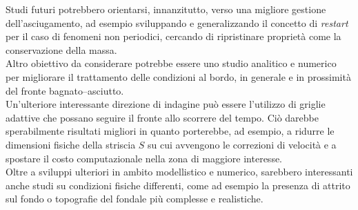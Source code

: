 \documentclass[a4paper,12pt,oneside]{book}
\theoremstyle{definition}
\begin{document}
Studi futuri potrebbero orientarsi, innanzitutto, verso una migliore gestione dell'asciugamento, ad esempio sviluppando e generalizzando il concetto di \emph{restart} per il caso di fenomeni non periodici, cercando di ripristinare propriet\`a come la conservazione della massa.\\
Altro obiettivo da considerare potrebbe essere uno studio analitico e numerico per migliorare il trattamento delle condizioni al bordo, in generale e in prossimit\`a del fronte bagnato--asciutto.\\
Un'ulteriore interessante direzione di indagine pu\`o essere l'utilizzo di griglie adattive che possano seguire il fronte allo scorrere del tempo. Ci\`o darebbe sperabilmente risultati migliori in quanto porterebbe, ad esempio, a ridurre le dimensioni fisiche della striscia $S$ su cui avvengono le correzioni di velocit\`a e a spostare il costo computazionale nella zona di maggiore interesse.\\
Oltre a sviluppi ulteriori in ambito modellistico e numerico, sarebbero interessanti anche studi su condizioni fisiche differenti, come ad esempio la presenza di attrito sul fondo o topografie del fondale pi\`u complesse e realistiche.



\backmatter



\nocite{PortaPerottoBallio}
\nocite{Horritt2002}
\nocite{Quarteroni2008}
\nocite{Quarteroni2008a}


%
%
%

\clearpage{} \lhead{}

  


\listoffigures
\clearpage


\end{document}
